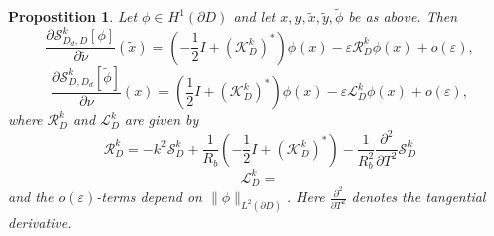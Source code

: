 \documentclass[a4paper]{article}
\newtheorem{prop}{Propostition}
\theoremstyle{definition}
\renewcommand{\L}{\mathcal{L}}
\renewcommand{\S}{\mathcal{S}}
\newcommand{\K}{\mathcal{K}}
\renewcommand{\epsilon}{\varepsilon}
\begin{document}
\begin{prop} \label{prop:asympderiv}
	Let $\phi \in H^1(\partial D)$ and let $x,y,\tilde{x},\tilde{y},\tilde{\phi}$ be as above. Then 
\begin{equation*}
\frac{\partial \S_{D_d,D}^k[\phi]}{\partial \tilde{\nu}} (\tilde{x}) = \left(-\frac{1}{2}I + \left(\K_D^k\right)^*\right)\phi(x) - \epsilon \mathcal{R}_D^k\phi(x) + o(\epsilon),
\end{equation*}
\begin{equation*}
\frac{\partial \S_{D,D_d}^k[\tilde{\phi}]}{\partial \nu} (x) = \left(\frac{1}{2}I + \left(\K_D^k\right)^*\right)\phi(x) - \epsilon \L_D^k\phi(x) + o(\epsilon),
\end{equation*}
where $\mathcal{R}_D^k$ and $\L_D^k$ are given by
\begin{equation*}
\mathcal{R}_D^k = -k^2\S_D^k + \frac{1}{R_b} \left(-\frac{1}{2}I + \left(\K_D^k\right)^*\right) -\frac{1}{R_b^2}\frac{\partial^2}{\partial T^2}\S_D^k
\end{equation*}
\begin{equation*}
\L_D^k =
\end{equation*}
and the $o(\epsilon)$-terms depend on $\|\phi\|_{L^2(\partial D)}$. Here $\frac{\partial^2}{\partial T^2}$ denotes the tangential derivative. 
\end{prop}
\end{document}
